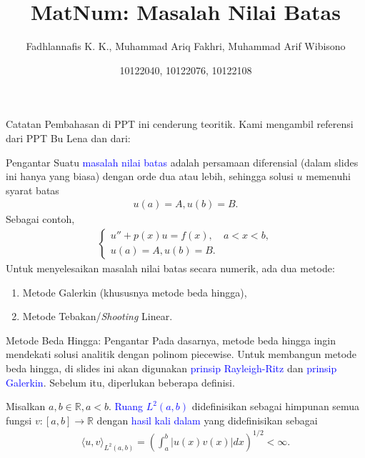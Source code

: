 \documentclass[xcolor={dvipsnames}, 9pt]{beamer}
\title{MatNum: Masalah Nilai Batas}
\author{Fadhlannafis K. K., Muhammad Ariq Fakhri, Muhammad Arif Wibisono}
\date{10122040, 10122076, 10122108}
\renewcommand{\emph}[1]{\textcolor{Blue}{#1}}
\begin{document}
	\begin{frame}[plain]
		\maketitle
	\end{frame}
	\begin{frame}{Catatan}
		Pembahasan di PPT ini cenderung teoritik. Kami mengambil referensi dari PPT Bu Lena dan dari:
		\nocite{*}
		\printbibliography
	\end{frame}
	\begin{frame}{Pengantar}
		Suatu \emph{masalah nilai batas} adalah persamaan diferensial (dalam slides ini hanya yang biasa) dengan orde dua atau lebih, sehingga solusi $u$ memenuhi syarat batas
		\begin{align*}
			u(a) = A, u(b) = B.
		\end{align*}
		Sebagai contoh,
		\begin{align*}
			\begin{cases}
				u'' + p(x)u = f(x), & a<x<b, \\
				u(a) = A, u(b) = B.
			\end{cases}
		\end{align*}
		Untuk menyelesaikan masalah nilai batas secara numerik, ada dua metode:
		\begin{enumerate}
			\item Metode Galerkin (khususnya metode beda hingga),
			\item Metode Tebakan/\textit{Shooting} Linear.
		\end{enumerate}
	\end{frame}
	\begin{frame}{Metode Beda Hingga: Pengantar}
		Pada dasarnya, metode beda hingga ingin mendekati solusi analitik dengan polinom piecewise. Untuk membangun metode beda hingga, di slides ini akan digunakan \emph{prinsip Rayleigh-Ritz} dan \emph{prinsip Galerkin}. Sebelum itu, diperlukan beberapa definisi. \par
		\begin{definition}[Ruang $L^2$]
			Misalkan $a,b\in\mathbb{R}, a<b$. \emph{Ruang $L^2(a,b)$} didefinisikan sebagai himpunan semua fungsi $v:[a,b]\to\mathbb{R}$ dengan \emph{hasil kali dalam} yang didefinisikan sebagai
			\begin{align*}
				\langle u,v\rangle_{L^2(a,b)} = \left(\int_{a}^{b} |u(x)v(x)| dx\right)^{1/2} < \infty.
			\end{align*}
		\end{definition}
	\end{frame}
\end{document}
